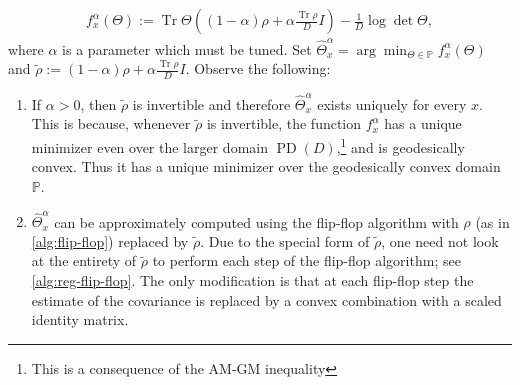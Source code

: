 \documentclass[aos]{imsart}
\theoremstyle{definition}
\numberwithin{equation}{section}
\DeclareMathOperator{\tr}{Tr}
\DeclareMathOperator{\PD}{PD}
\newcommand{\R}{{\mathbb{R}}}
\renewcommand{\P}{{\mathbb{P}}}
\newcommand{\samp}{x}
\newcommand{\CF}[1]{{\color{purple}[CF: #1]}}
\begin{document}
\begin{align*}
  f_{\samp}^\alpha(\Theta)
  :=  \tr \Theta \left((1 - \alpha) \rho + \alpha \frac{\tr \rho}{D} I\right) - \frac{1}{D}\log\det\Theta,
\end{align*}
where $\alpha$ is a parameter which must be tuned. Set $\widehat{\Theta}^\alpha_x = \arg\min_{\Theta \in \P} f^\alpha_\samp(\Theta)$ and  $\tilde{\rho} := (1- \alpha) \rho + \alpha \frac{\tr \rho}{D} I.$
Observe the following:
\begin{enumerate}
\item If $\alpha > 0$, then $\tilde{\rho}$ is invertible and therefore $\widehat{\Theta}^\alpha_x$ exists uniquely for every $x$. 
This is because, whenever $\tilde{\rho}$ is invertible, the function $f_{\samp}^\alpha$ has a unique minimizer even over the larger domain $\PD(D)$,\footnote{This is a consequence of the AM-GM inequality} and is geodesically convex. 
Thus it has a unique minimizer over the geodesically convex domain $\P$. 
\item $\widehat{\Theta}^\alpha_x$ can be approximately computed using the flip-flop algorithm with $\rho$ (as in \cref{alg:flip-flop}) replaced by $\tilde{\rho}$. 
Due to the special form of $\tilde{\rho}$, one need not look at the entirety of $\tilde{\rho}$ to perform each step of the flip-flop algorithm; see \cref{alg:reg-flip-flop}. The only modification is that at each flip-flop step the estimate of the covariance is replaced by a convex combination with a scaled identity matrix. 


\end{enumerate}
\end{document}
